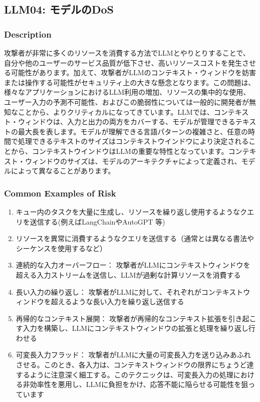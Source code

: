 \documentclass[
]{article}
\author{}
\date{}
\providecommand{\tightlist}{%
  \setlength{\itemsep}{0pt}\setlength{\parskip}{0pt}}
\begin{document}
\subsection{LLM04: モデルのDoS}\label{llm04-ux30e2ux30c7ux30ebux306edos}

\subsubsection{Description}\label{description}

攻撃者が非常に多くのリソースを消費する方法でLLMとやりとりすることで、自分や他のユーザーのサービス品質が低下させ、高いリソースコストを発生させる可能性があります。加えて、攻撃者がLLMのコンテキスト・ウィンドウを妨害または操作する可能性がセキュリティ上の大きな懸念となります。この問題は、様々なアプリケーションにおけるLLM利用の増加、リソースの集中的な使用、ユーザー入力の予測不可能性、およびこの脆弱性については一般的に開発者が無知なことから、よりクリティカルになってきています。LLMでは、コンテキスト・ウィンドウは、入力と出力の両方をカバーする、モデルが管理できるテキストの最大長を表します。モデルが理解できる言語パターンの複雑さと、任意の時間で処理できるテキストのサイズはコンテキストウインドウにより決定されることから、コンテキストウインドウはLLMの重要な特性となっています。コンテキスト・ウィンドウのサイズは、モデルのアーキテクチャによって定義され、モデルによって異なることがあります。

\subsubsection{Common Examples of Risk}\label{common-examples-of-risk}

\begin{enumerate}
\def\labelenumi{\arabic{enumi}.}
\tightlist
\item
  キュー内のタスクを大量に生成し、リソースを繰り返し使用するようなクエリを送信する(例えばLangChainやAutoGPT
  等)
\item
  リソースを異常に消費するようなクエリを送信する（通常とは異なる書法やシーケンスを使用するなど）
\item
  連続的な入力オーバーフロー：
  攻撃者がLLMにコンテキストウィンドウを超える入力ストリームを送信し、LLMが過剰な計算リソースを消費する
\item
  長い入力の繰り返し：
  攻撃者がLLMに対して、それぞれがコンテキストウィンドウを超えるような長い入力を繰り返し送信する
\item
  再帰的なコンテキスト展開：
  攻撃者が再帰的なコンテキスト拡張を引き起こす入力を構築し、LLMにコンテキストウィンドウの拡張と処理を繰り返し行わせる
\item
  可変長入力フラッド：
  攻撃者がLLMに大量の可変長入力を送り込みあふれさせる。このとき、各入力は、コンテキストウィンドウの限界にちょうど達するように注意深く細工する。このテクニックは、可変長入力の処理における非効率性を悪用し、LLMに負担をかけ、応答不能に陥らせる可能性を狙っています
\end{enumerate}
\end{document}
